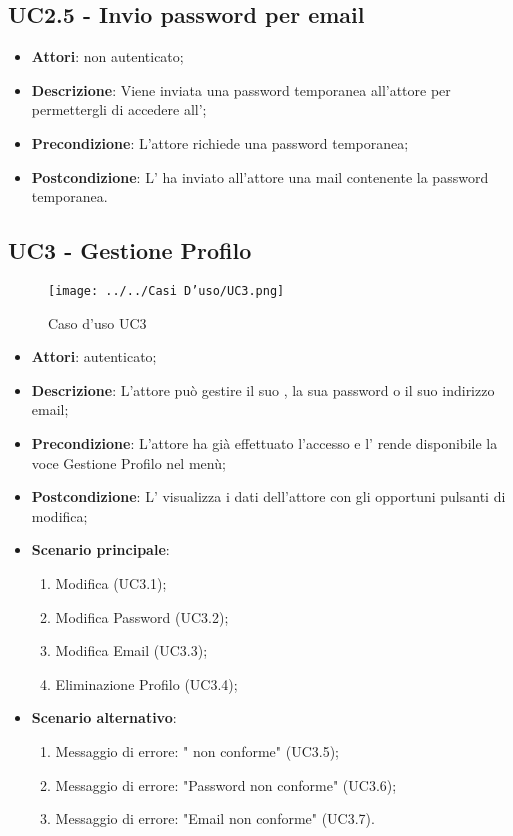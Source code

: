 \subsection{UC2.5 - Invio password per email}
\label{ssec:UC2.5}
\begin{itemize}
\item \textbf{Attori}:  non autenticato;
\item \textbf{Descrizione}: Viene inviata una password temporanea all'attore per permettergli di accedere all';
\item \textbf{Precondizione}: L'attore richiede una password temporanea;
\item \textbf{Postcondizione}: L' ha inviato all'attore una mail contenente la password temporanea.
\end{itemize}
\newpage
\subsection{UC3 - Gestione Profilo}
\label{ssec:UC3}
\begin{figure}[h!]
\centering
\texttt{[image: ../../Casi D'uso/UC3.png]}
\caption{Caso d'uso UC3}
 \end{figure}
\begin{itemize}
\item \textbf{Attori}:  autenticato;
\item \textbf{Descrizione}: L'attore può gestire il suo , la sua password o il suo indirizzo email;
\item \textbf{Precondizione}: L'attore ha già effettuato l'accesso e l' rende disponibile la voce Gestione Profilo nel menù;
\item \textbf{Postcondizione}: L' visualizza i dati dell'attore con gli opportuni pulsanti di modifica;
\item \textbf{Scenario principale}:
	\begin{enumerate}\item Modifica  (UC3.1);\item Modifica Password (UC3.2);\item Modifica Email (UC3.3);\item Eliminazione Profilo (UC3.4);\end{enumerate}
\item \textbf{Scenario alternativo}:
	\begin{enumerate} \item Messaggio di errore: " non conforme" (UC3.5);\item Messaggio di errore: "Password non conforme" (UC3.6);\item Messaggio di errore: "Email non conforme" (UC3.7).
	\end{enumerate}
\end{itemize}
